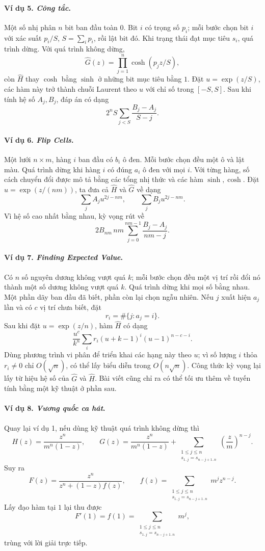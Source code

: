 \documentclass[11pt]{article}
\begin{document}
\paragraph{Ví dụ 5. \emph{Công tắc}.}
Một số nhị phân \(n\) bit ban đầu toàn \(0\). Bit \(i\) có trọng số \(p_i\); mỗi
bước chọn bit \(i\) với xác suất \(p_i/S\), \(S=\sum_i p_i\), rồi lật bit đó.
Khi trạng thái đạt mục tiêu \(s_i\), quá trình dừng. Với quá trình không dừng,
\[
  \widehat G(z)=\prod_{j=1}^n \cosh(p_jz/S),
\]
còn \(\widehat H\) thay \(\cosh\) bằng \(\sinh\) ở những bit mục tiêu bằng \(1\).
Đặt \(u=\exp(z/S)\), các hàm này trở thành chuỗi Laurent theo \(u\) với chỉ số
trong \([-S,S]\). Sau khi tính hệ số \(A_j,B_j\), đáp án có dạng
\[
  2^nS\sum_{j<S}\frac{B_j-A_j}{S-j}.
\]

\paragraph{Ví dụ 6. \emph{Flip Cells}.}
Một lưới \(n\times m\), hàng \(i\) ban đầu có \(b_i\) ô đen. Mỗi bước chọn đều
một ô và lật màu. Quá trình dừng khi hàng \(i\) có đúng \(a_i\) ô đen với mọi
\(i\). Với từng hàng, số cách chuyển đổi được mô tả bằng các tổng nhị thức và
các hàm \(\sinh,\cosh\). Đặt \(u=\exp(z/(nm))\), ta đưa cả \(\widehat H\) và
\(\widehat G\) về dạng
\[
  \sum_j A_ju^{2j-nm},\qquad \sum_j B_ju^{2j-nm}.
\]
Vì hệ số cao nhất bằng nhau, kỳ vọng rút về
\[
  2B_{nm}\,nm\sum_{j=0}^{nm-1}\frac{B_j-A_j}{nm-j}.
\]

\paragraph{Ví dụ 7. \emph{Finding Expected Value}.}
Có \(n\) số nguyên dương không vượt quá \(k\); mỗi bước chọn đều một vị trí rồi
đổi nó thành một số dương không vượt quá \(k\). Quá trình dừng khi mọi số bằng
nhau. Một phần dãy ban đầu đã biết, phần còn lại chọn ngẫu nhiên. Nếu \(j\)
xuất hiện \(a_j\) lần và có \(c\) vị trí chưa biết, đặt
\[
  r_i=\#\{j:a_j=i\}.
\]
Sau khi đặt \(u=\exp(z/n)\), hàm \(\widehat H\) có dạng
\[
  \frac{u^c}{k^n}\sum_i r_i(u+k-1)^i(u-1)^{n-c-i}.
\]
Dùng phương trình vi phân để triển khai các hạng này theo \(u\); vì số lượng
\(i\) thỏa \(r_i\ne0\) chỉ \(O(\sqrt n)\), có thể lấy biểu diễn trong
\(O(n\sqrt n)\). Công thức kỳ vọng lại lấy từ hiệu hệ số của \(\widehat G\) và
\(\widehat H\). Bài viết cũng chỉ ra có thể tối ưu thêm về tuyến tính bằng một
kỹ thuật ở phần sau.

\paragraph{Ví dụ 8. \emph{Vương quốc ca hát}.}
Quay lại ví dụ 1, nếu dùng kỹ thuật quá trình không dừng thì
\[
  H(z)=\frac{z^n}{m^n(1-z)},\qquad
  G(z)=\frac{z^n}{m^n(1-z)}+
  \sum_{\substack{1\le j\le n\\s_{1..j}=s_{n-j+1..n}}}
  \left(\frac zm\right)^{n-j}.
\]
Suy ra
\[
  F(z)=\frac{z^n}{z^n+(1-z)f(z)},\qquad
  f(z)=\sum_{\substack{1\le j\le n\\s_{1..j}=s_{n-j+1..n}}}m^jz^{n-j}.
\]
Lấy đạo hàm tại \(1\) lại thu được
\[
  F'(1)=f(1)=
  \sum_{\substack{1\le j\le n\\s_{1..j}=s_{n-j+1..n}}}m^j,
\]
trùng với lời giải trực tiếp.
\end{document}
